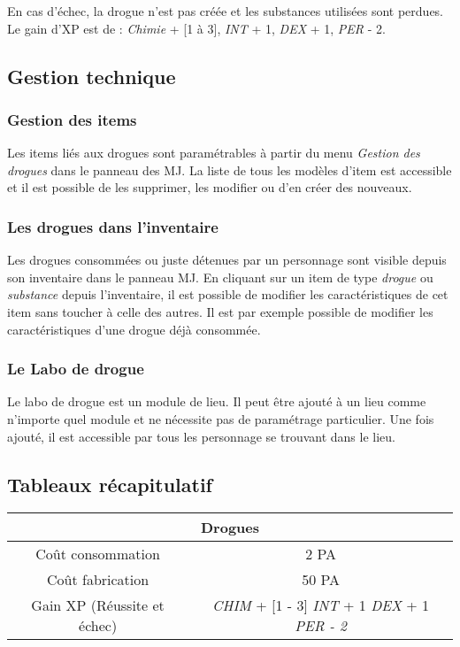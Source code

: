 En cas d'échec, la drogue n'est pas créée et les substances utilisées sont perdues. Le gain d'XP est de : \emph{Chimie} + [1 à 3], \emph{INT} + 1, \emph{DEX} + 1, \emph{PER} - 2.

\subsection{Gestion technique}

\subsubsection{Gestion des items}

Les items liés aux drogues sont paramétrables à partir du menu \emph{Gestion des drogues} dans le panneau des MJ. La liste de tous les modèles d'item est accessible et il est possible de les supprimer, les modifier ou d'en créer des nouveaux.

\subsubsection{Les drogues dans l'inventaire}

Les drogues consommées ou juste détenues par un personnage sont visible depuis son inventaire dans le panneau MJ. En cliquant sur un item de type \emph{drogue} ou \emph{substance} depuis l'inventaire, il est possible de modifier les caractéristiques de cet item sans toucher à celle des autres. Il est par exemple possible de modifier les caractéristiques d'une drogue déjà consommée.

\subsubsection{Le Labo de drogue}

Le labo de drogue est un module de lieu. Il peut être ajouté à un lieu comme n'importe quel module et ne nécessite pas de paramétrage particulier. Une fois ajouté, il est accessible par tous les personnage se trouvant dans le lieu.

\subsection{Tableaux récapitulatif}

\begin{tabular}{|c|c|}
	\hline
	\multicolumn{2}{|c|}{Drogues} \\
	\hline
	Coût consommation & 2 PA \\
	Coût fabrication & 50 PA \\
	Gain XP (Réussite et échec) & \emph{CHIM} + [1 - 3] \emph{INT} + 1 \emph{DEX} + 1 \emph{PER - 2} \\
	\hline
\end{tabular}
